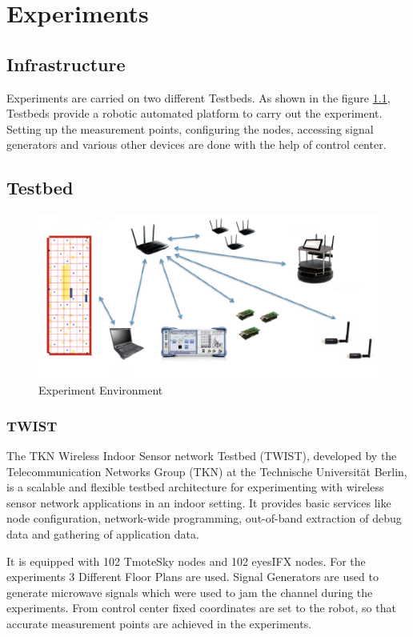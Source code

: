 \documentclass[11pt,a4paper,headinclude,footinclude,chapterprefix=on]{scrreprt}
\begin{document}
\chapter{Experiments} 
\section{Infrastructure} 
Experiments are carried on two different Testbeds. As shown in the figure \ref{fig:experiment}, Testbeds provide a robotic automated platform to carry out the experiment. Setting up the measurement points, configuring the nodes, accessing signal generators and various other devices are done with the help of control center. 
\section{Testbed}
\begin{figure}
	[!] \centering 
	\includegraphics[width=15cm]{Images/evari.png} \caption{Experiment Environment} \label{fig:experiment} 
\end{figure}
\subsection{TWIST}
The TKN Wireless Indoor Sensor network Testbed (TWIST), developed by the Telecommunication Networks Group (TKN) at the Technische Universität Berlin, is a scalable and flexible testbed architecture for experimenting with wireless sensor network applications in an indoor setting. It provides basic services like node configuration, network-wide programming, out-of-band extraction of debug data and gathering of application data.

It is equipped with 102 TmoteSky nodes and 102 eyesIFX nodes. For the experiments 3 Different Floor Plans are used. Signal Generators are used to generate microwave signals which were used to jam the channel during the experiments. From control center fixed coordinates
are set to the robot, so that accurate measurement points are achieved in the experiments. 
\end{document}

